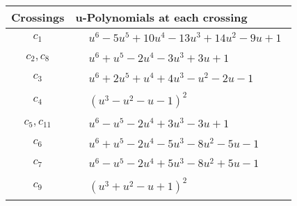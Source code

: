 \documentclass[1p]{elsarticle_modified}
\theoremstyle{definition}
\begin{document}
\begin{tabular}{m{50pt}|m{274pt}}
Crossings & \hspace{64pt}u-Polynomials at each crossing \\
\hline $$\begin{aligned}c_{1}\end{aligned}$$&$\begin{aligned}
&u^6-5 u^5+10 u^4-13 u^3+14 u^2-9 u+1
\end{aligned}$\\
\hline $$\begin{aligned}c_{2},c_{8}\end{aligned}$$&$\begin{aligned}
&u^6+u^5-2 u^4-3 u^3+3 u+1
\end{aligned}$\\
\hline $$\begin{aligned}c_{3}\end{aligned}$$&$\begin{aligned}
&u^6+2 u^5+u^4+4 u^3- u^2-2 u-1
\end{aligned}$\\
\hline $$\begin{aligned}c_{4}\end{aligned}$$&$\begin{aligned}
&(u^3- u^2- u-1)^2
\end{aligned}$\\
\hline $$\begin{aligned}c_{5},c_{11}\end{aligned}$$&$\begin{aligned}
&u^6- u^5-2 u^4+3 u^3-3 u+1
\end{aligned}$\\
\hline $$\begin{aligned}c_{6}\end{aligned}$$&$\begin{aligned}
&u^6+u^5-2 u^4-5 u^3-8 u^2-5 u-1
\end{aligned}$\\
\hline $$\begin{aligned}c_{7}\end{aligned}$$&$\begin{aligned}
&u^6- u^5-2 u^4+5 u^3-8 u^2+5 u-1
\end{aligned}$\\
\hline $$\begin{aligned}c_{9}\end{aligned}$$&$\begin{aligned}
&(u^3+u^2- u+1)^2
\end{aligned}$\\

\end{tabular}
\end{document}
